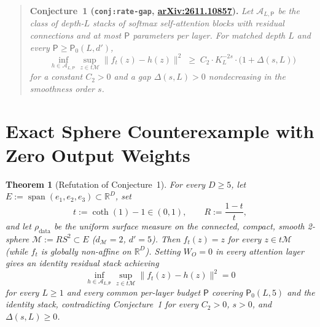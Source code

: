 \documentclass[11pt]{article}
\theoremstyle{plain}
\newtheorem{theorem}{Theorem}
\theoremstyle{definition}
\theoremstyle{remark}
\begin{document}
\begin{quote}
\textbf{Conjecture~1 (\texttt{conj:rate-gap}, \href{https://arxiv.org/abs/2611.10857}{arXiv:2611.10857}).}
\emph{Let $\mathcal{A}_{L, \mathsf{P}}$ be the class of depth-$L$ stacks of softmax self-attention blocks with residual connections and at most $\mathsf{P}$ parameters per layer. For matched depth $L$ and every $\mathsf{P} \ge \mathsf{P}_0(L, d')$,}
\[
\inf_{h \in \mathcal{A}_{L, \mathsf{P}}} \sup_{z \in t\mathcal{M}} \|f_t(z) - h(z)\|^2
\;\ge\; C_2 \cdot K_L^{-2s} \cdot \bigl(1 + \Delta(s, L)\bigr)
\]
\emph{for a constant $C_2 > 0$ and a gap $\Delta(s, L) > 0$ nondecreasing in the smoothness order $s$.}
\end{quote}

\section{Exact Sphere Counterexample with Zero Output Weights}

\begin{theorem}[Refutation of Conjecture~1]\label{thm:sphere}
For every $D \ge 5$, let $E := \operatorname{span}(e_1, e_2, e_3) \subset \mathbb{R}^D$, set
\begin{equation}\label{eq:sphere-params}
t := \coth(1) - 1 \in (0, 1), \qquad R := \frac{1 - t}{t},
\end{equation}
and let $\rho_{\mathrm{data}}$ be the uniform surface measure on the connected, compact, smooth 2-sphere $\mathcal{M} := R S^2 \subset E$ ($d_{\mathcal{M}} = 2$, $d' = 5$). Then $f_t(z) = z$ for every $z \in t\mathcal{M}$ (while $f_t$ is globally non-affine on $\mathbb{R}^D$). Setting $W_O = 0$ in every attention layer gives an identity residual stack achieving
\[
\inf_{h \in \mathcal{A}_{L, \mathsf{P}}} \sup_{z \in t\mathcal{M}} \|f_t(z) - h(z)\|^2 = 0
\]
for every $L \ge 1$ and every common per-layer budget $\mathsf{P}$ covering $\mathsf{P}_0(L, 5)$ and the identity stack, contradicting Conjecture~1 for every $C_2 > 0$, $s > 0$, and $\Delta(s, L) \ge 0$.
\end{theorem}
\end{document}
